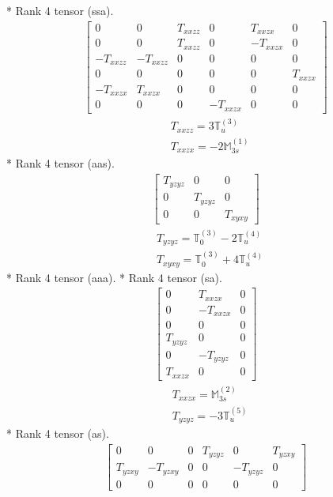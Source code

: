 \documentclass[fleqn,8pt,landscape]{jsarticle}
\begin{document}
* Rank 4 tensor (ssa).
\begin{align*}
\begin{bmatrix} 0 & 0 & T_{xxzz} & 0 & T_{xxzx} & 0 \\ 0 & 0 & T_{xxzz} & 0 & - T_{xxzx} & 0 \\ - T_{xxzz} & - T_{xxzz} & 0 & 0 & 0 & 0 \\ 0 & 0 & 0 & 0 & 0 & T_{xxzx} \\ - T_{xxzx} & T_{xxzx} & 0 & 0 & 0 & 0 \\ 0 & 0 & 0 & - T_{xxzx} & 0 & 0 \end{bmatrix}
\end{align*}
\begin{align*}
& T_{xxzz} = 3 \mathbb{T}_{u}^{(3)} \\
& T_{xxzx} = - 2 \mathbb{M}_{3s}^{(1)}
\end{align*}
* Rank 4 tensor (aas).
\begin{align*}
\begin{bmatrix} T_{yzyz} & 0 & 0 \\ 0 & T_{yzyz} & 0 \\ 0 & 0 & T_{xyxy} \end{bmatrix}
\end{align*}
\begin{align*}
& T_{yzyz} = \mathbb{T}_{0}^{(3)} - 2 \mathbb{T}_{u}^{(4)} \\
& T_{xyxy} = \mathbb{T}_{0}^{(3)} + 4 \mathbb{T}_{u}^{(4)}
\end{align*}
* Rank 4 tensor (aaa).
* Rank 4 tensor (sa).
\begin{align*}
\begin{bmatrix} 0 & T_{xxzx} & 0 \\ 0 & - T_{xxzx} & 0 \\ 0 & 0 & 0 \\ T_{yzyz} & 0 & 0 \\ 0 & - T_{yzyz} & 0 \\ T_{xxzx} & 0 & 0 \end{bmatrix}
\end{align*}
\begin{align*}
& T_{xxzx} = \mathbb{M}_{3s}^{(2)} \\
& T_{yzyz} = - 3 \mathbb{T}_{u}^{(5)}
\end{align*}
* Rank 4 tensor (as).
\begin{align*}
\begin{bmatrix} 0 & 0 & 0 & T_{yzyz} & 0 & T_{yzxy} \\ T_{yzxy} & - T_{yzxy} & 0 & 0 & - T_{yzyz} & 0 \\ 0 & 0 & 0 & 0 & 0 & 0 \end{bmatrix}
\end{align*}
\end{document}
